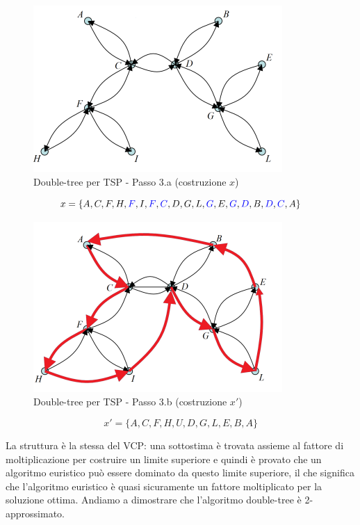 \documentclass{article}
\begin{document}
\begin{figure}[H]
    \centering
    \includegraphics[scale=0.6]{images/TSP_double_tree_2.png}
    \caption{Double-tree per TSP - Passo 3.a (costruzione $x$)}
\end{figure}
$$x=\{
    A,C,F,H,\textcolor{blue}{F},I,\textcolor{blue}{F},\textcolor{blue}{C},
    D,G,L,\textcolor{blue}{G},E,\textcolor{blue}{G},
    \textcolor{blue}{D},B,\textcolor{blue}{D},\textcolor{blue}{C},A
    \}$$

\begin{figure}[H]
    \centering
    \includegraphics[scale=0.6]{images/TSP_double_tree_3.png}
    \caption{Double-tree per TSP - Passo 3.b (costruzione $x'$)}
\end{figure}

$$x'=\{A,C,F,H,U,D,G,L,E,B,A\}$$

La struttura è la stessa del VCP: una sottostima è trovata assieme al fattore di moltiplicazione
per costruire un limite superiore e quindi è provato che un algoritmo euristico può essere
dominato da questo limite superiore, il che significa che l'algoritmo euristico
è quasi sicuramente un fattore moltiplicato per la soluzione ottima. Andiamo a dimostrare
che l'algoritmo double-tree è 2-approssimato.
\end{document}
